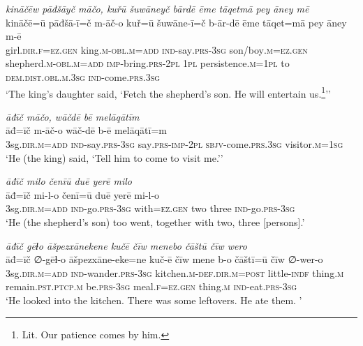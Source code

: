 \ea \label{KŠ.40}
\textit{kināčēw pāđšāyč māčo, kuřū šuwāneyč bārdē ēme tāqetmā pey āney mē} \\ 
\gll kināčē=ū pāđšā-ī=č m-āč-o kuř=ū šuwāne-ī=č b-ār-dē ēme tāqet=mā pey āney m-ē \\ 
 girl\textsc{.dir}\textsc{.f}\textsc{=ez.gen} king\textsc{.m}\textsc{-obl}\textsc{.m}\textsc{=add} \textsc{ind-}say\textsc{.prs}\textsc{-3sg} son/boy\textsc{.m}\textsc{=ez.gen} shepherd\textsc{.m}\textsc{-obl}\textsc{.m}\textsc{=add} \textsc{imp-}bring\textsc{.prs}-\textsc{2pl} \textsc{1pl} persistence\textsc{.m}\textsc{=\textsc{1pl}} to \textsc{dem.dist}\textsc{.obl}\textsc{.m}\textsc{.3sg} \textsc{ind-}come\textsc{.prs}\textsc{.3sg} \\ 
\glt `The king’s daughter said, ‘Fetch the shepherd’s son. He will entertain us.\footnote{Lit. Our patience comes by him.}’'
\z 
 
\ea \label{KŠ.52}
\textit{āđīč māčo, wāčdē bē melāqātīm} \\ 
\gll āđ=īč m-āč-o wāč-dē b-ē melāqātī=m \\ 
 3sg\textsc{.dir}\textsc{.m}\textsc{=add} \textsc{ind-}say\textsc{.prs}\textsc{-3sg} say\textsc{.prs}-\textsc{imp-}\textsc{2pl} \textsc{sbjv-}come\textsc{.prs}\textsc{.3sg} visitor\textsc{.m}\textsc{=\textsc{1sg}} \\ 
\glt `He (the king) said, ‘Tell him to come to visit me.’'
\z 
 
\ea \label{KŠ.54}
\textit{āđīč milo čenīū duē yerē milo} \\ 
\gll āđ=īč mi-l-o čenī=ū duē yerē mi-l-o \\ 
 3sg\textsc{.dir}\textsc{.m}\textsc{=add} \textsc{ind-}go\textsc{.prs}\textsc{-3sg} with\textsc{=ez.gen} two three \textsc{ind-}go\textsc{.prs}\textsc{-3sg} \\ 
\glt `He (the shepherd’s son) too went, together with two, three [persons].'
\z 
 
\ea \label{KŠ.63}
\textit{āđīč gēɫo āšpezxānekene kučē čīw menebo čāštū čīw wero} \\ 
\gll āđ=īč ∅-gēɫ-o āšpezxāne-eke=ne kuč-ē čīw mene b-o čāštī=ū čīw ∅-wer-o \\ 
 3sg\textsc{.dir}\textsc{.m}\textsc{=add} \textsc{ind-}wander\textsc{.prs}\textsc{-3sg} kitchen\textsc{.m}\textsc{-def}\textsc{.dir}\textsc{.m}\textsc{=\textsc{post}} little\textsc{-indf} thing\textsc{.m} remain\textsc{.pst}\textsc{.ptcp}\textsc{.m} be\textsc{.prs}\textsc{-3sg} meal\textsc{.f}\textsc{\textsc{=ez.gen}} thing\textsc{.m} \textsc{ind-}eat\textsc{.prs}\textsc{-3sg} \\ 
\glt `He looked into the kitchen. There was some leftovers. He ate them. '
\z 
 
